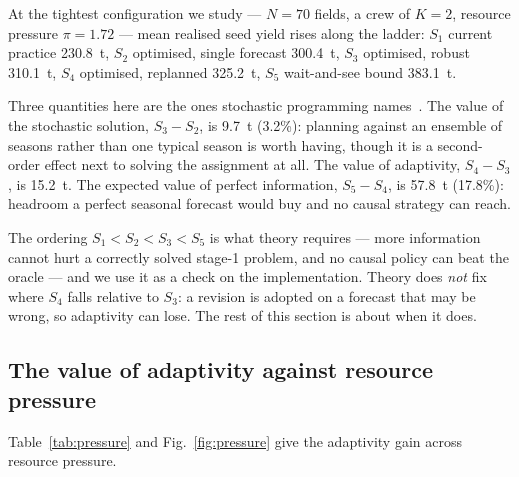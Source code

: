 \documentclass[10pt,twocolumn]{article}
\begin{document}
At the tightest configuration we study --- $N = 70$ fields, a crew of $K = 2$, resource pressure $\pi = 1.72$ --- mean realised seed yield rises along
the ladder:
$S_1$ current practice 230.8~t, $S_2$ optimised, single forecast 300.4~t, $S_3$ optimised, robust 310.1~t, $S_4$ optimised, replanned 325.2~t, $S_5$ wait-and-see bound 383.1~t.

Three quantities here are the ones stochastic programming
names~\cite{birge}. The value of the stochastic solution,
$S_3 - S_2$, is 9.7~t (3.2\%):
planning against an ensemble of seasons rather than one typical
season is worth having, though it is a second-order effect next to
solving the assignment at all. The value of adaptivity, $S_4 - S_3$,
is 15.2~t. The expected value of perfect information,
$S_5 - S_4$, is 57.8~t (17.8\%):
headroom a perfect seasonal forecast would buy and no causal
strategy can reach.

The ordering $S_1 < S_2 < S_3 < S_5$ is what theory requires --- more
information cannot hurt a correctly solved stage-1 problem, and no
causal policy can beat the oracle --- and we use it as a check on
the implementation. Theory does \emph{not} fix where $S_4$ falls
relative to $S_3$: a revision is adopted on a forecast that may be
wrong, so adaptivity can lose. The rest of this section is about
when it does.

\subsection{The value of adaptivity against resource pressure}

Table~\ref{tab:pressure} and Fig.~\ref{fig:pressure} give the
adaptivity gain across resource pressure.
\end{document}

